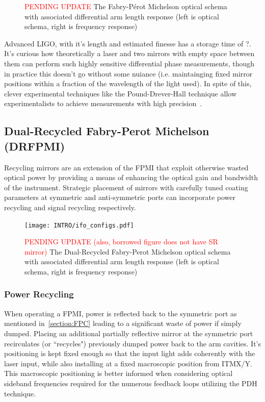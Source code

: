 \begin{figure}[h!]
  \begin{subfigure}{\texttt{[image: INTRO/ifo\_configs.pdf]}}
  \end{subfigure}
  \hfill
  \begin{subfigure}{\texttt{[image: mich\_fr.pdf]}}%
  \end{subfigure}
  \hfill
  \caption{\textcolor{red}{PENDING UPDATE} The Fabry-P\'{e}rot Michelson optical schema with associated differential arm length response (left is optical schema, right is frequency response)}
  \label{fig:fpmi}
\end{figure}

Advanced LIGO, with it's length and estimated finesse has a storage time of ?.
It's curious how theoretically a laser and two mirrors with empty space between them can perform such highly sensitive differential phase measurements, though in practice this doesn't go without some nuiance (i.e. maintainging fixed mirror positions within a fraction of the wavelength of the light used). In spite of this, clever experimental techniques like the Pound-Drever-Hall technique allow experimentalists to achieve measurements with high precision~\cite{?}. 

\subsection{Dual-Recycled Fabry-Perot Michelson (DRFPMI)}
Recycling mirrors are an extension of the FPMI that exploit otherwise wasted optical power by providing a means of enhancing the optical gain and bandwidth of the instrument. Strategic placement of mirrors with carefully tuned coating parameters at symmetric and anti-symmetric ports can incorporate power recycling and signal recycling respectively.

\begin{figure}[H]
\begin{center}
\texttt{[image: INTRO/ifo\_configs.pdf]}
\end{center}
\caption{\textcolor{red}{PENDING UPDATE (also, borrowed figure does not have SR mirror)} The Dual-Recycled Fabry-Perot Michelson optical schema with associated differential arm length response (left is optical schema, right is frequency response)}
\label{fig:drfp_michelson}
\end{figure}


\subsubsection{Power Recycling}
When operating a FPMI, power is reflected back to the symmetric port as mentioned in~\ref{section:FPC} leading to a significant waste of power if simply dumped. Placing an additional partially reflective mirror at the symmetric port recirculates (or ``recycles") previously dumped power back to the arm cavities. It's positioning is kept fixed enough so that the input light adds coherently with the laser input, while also installing at a fixed macroscopic position from ITMX/Y. This macroscopic positioning is better informed when considering optical sideband frequencies required for the numerous feedback loops utilizing the PDH technique.

